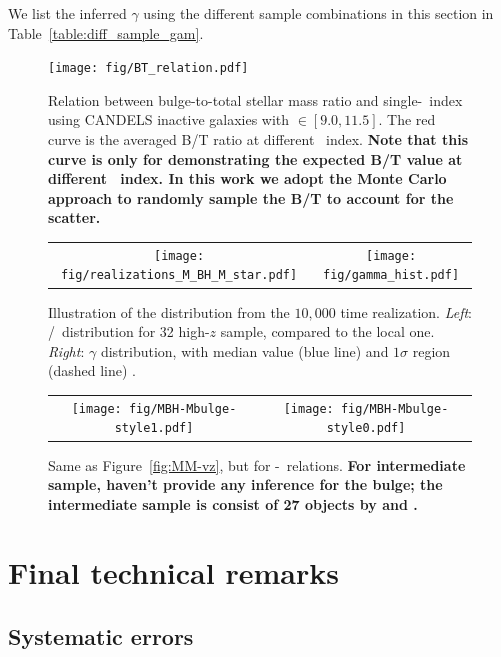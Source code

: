 \documentclass[apj]{emulateapj}
\begin{document}
We list the inferred $\gamma$ using the different sample combinations in this section in
Table~\ref{table:diff_sample_gam}.

\begin{figure}
\centering
{
\texttt{[image: fig/BT\_relation.pdf]}
}
\caption{\label{fig:BT-n_relation} 
Relation between bulge-to-total stellar mass ratio and single-\sersic\ index using CANDELS inactive galaxies with \smass$\in [9.0, 11.5]$. The red curve is the averaged B/T ratio at different \sersic\ index. {\bf Note that this curve is only for demonstrating the expected B/T value at different \sersic\ index. In this work we adopt the Monte Carlo approach to randomly sample the B/T to account for the scatter.}
}
\end{figure} 

\begin{figure}
\centering
\begin{tabular}{c c}
{\texttt{[image: fig/realizations\_M\_BH\_M\_star.pdf]}}&
{\texttt{[image: fig/gamma\_hist.pdf]}}\\
\end{tabular}
\caption{\label{fig:gamma_hist} 
Illustration of the distribution from the $10,000$ time realization. {\it Left}: \mbh/\smass\ distribution for 32 high-$z$ sample, compared to the local one. {\it Right}: $\gamma$ distribution, with median value (blue line) and $1\sigma$ region (dashed line) .
}
\end{figure}

\begin{figure}
\centering
\begin{tabular}{c c}
{\texttt{[image: fig/MBH-Mbulge-style1.pdf]}}&
{\texttt{[image: fig/MBH-Mbulge-style0.pdf]}}\\
\end{tabular}
\caption{\label{fig:MM_bulge-vz}
Same as Figure~\ref{fig:MM-vz}, but for \mbh-\bmass\ relations. {\bf For intermediate sample, \citet{Cisternas2011} haven't provide any inference for the bulge; the intermediate sample is consist of 27 objects by \citet{Bennert11} and \citet{SS13}.}}
\end{figure} 


\section{Final technical remarks}
\label{sec:dis}


\subsection{Systematic errors}
\end{document}
